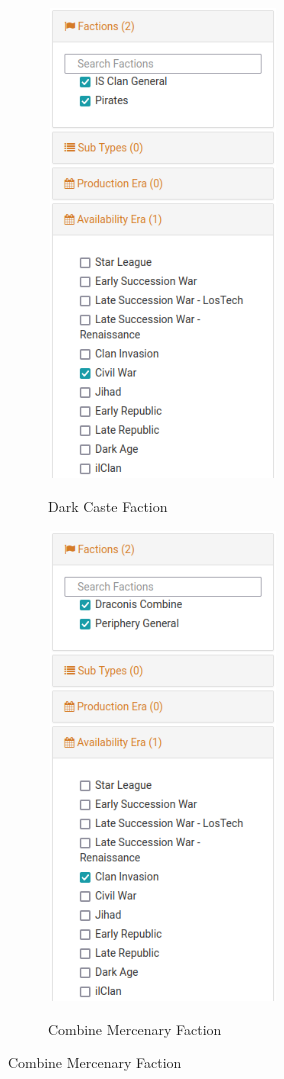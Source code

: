 \begin{figure}[!h]
  \begin{center}
  \begin{subfigure}{0.4\textwidth}
    \centering
    \includegraphics[alt='Dark Caste Faction list', height=4.9in, width=2.4in]{img/Dark-Caste-List.png}
    \caption*{Dark Caste Faction}
  \end{subfigure}
  \hspace{1in}
  \begin{subfigure}{0.4\textwidth}
    \centering
    \includegraphics[alt='Combine Mercenary Faction list', height=4.9in, width=2.4in]{img/Combine-Mercenary-List.png}
    \caption*{Combine Mercenary Faction}
  \end{subfigure}
  \end{center}
\end{figure}
